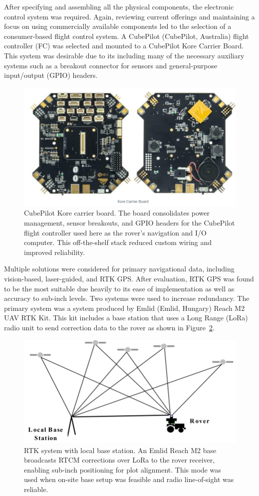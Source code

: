 After specifying and assembling all the physical components, the electronic control system was required. Again, reviewing current offerings and maintaining a focus on using commercially available components led to the selection of a consumer-based flight control system. A CubePilot (CubePilot, Australia) flight controller (FC) was selected and mounted to a CubePilot Kore Carrier Board. This system was desirable due to its including many of the necessary auxiliary systems such as a breakout connector for sensors and general-purpose input/output (GPIO) headers.

\begin{figure}[!ht]
    \centering
    \includegraphics[width=0.5\linewidth]{images/Kore Carrier.png}
    \caption{CubePilot Kore carrier board. The board consolidates power management, sensor breakouts, and GPIO headers for the CubePilot flight controller used here as the rover’s navigation and I/O computer. This off-the-shelf stack reduced custom wiring and improved reliability.}
    \label{fig:Carrier board}
\end{figure}

Multiple solutions were considered for primary navigational data, including vision-based, laser-guided, and RTK GPS. After evaluation, RTK GPS was found to be the most suitable due heavily to its ease of implementation as well as accuracy to sub-inch levels. Two systems were used to increase redundancy. The primary system was a system produced by Emlid (Emlid, Hungary) Reach M2 UAV RTK Kit. This kit includes a base station that uses a Long Range (LoRa) radio unit to send correction data to the rover as shown in Figure~\ref{fig:Local Corection RTK}.

\begin{figure}[!ht]
    \centering
    \includegraphics[width=0.5\linewidth]{images/RTK-GPS.png}
    \caption{RTK system with local base station. An Emlid Reach M2 base broadcasts RTCM corrections over LoRa to the rover receiver, enabling sub-inch positioning for plot alignment. This mode was used when on-site base setup was feasible and radio line-of-sight was reliable.}
    \label{fig:Local Corection RTK}
\end{figure}

